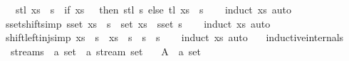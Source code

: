 \begin{isabellebody}
\ \ \ {\isachardoublequoteopen}stl\ {\isacharparenleft}xs\ {\isacharat}{\isacharminus}\ s{\isacharparenright}\ {\isacharequal}\ {\isacharparenleft}if\ xs\ {\isacharequal}\ {\isacharbrackleft}{\isacharbrackright}\ then\ stl\ s\ else\ tl\ xs\ {\isacharat}{\isacharminus}\ s{\isacharparenright}{\isachardoublequoteclose}\isanewline
%
\isadelimproof
\ \ %
\endisadelimproof
%
\isatagproof
{}\isamarkupfalse%
\ {\isacharparenleft}induct\ xs{\isacharparenright}\ auto%
\endisatagproof
{\isafoldproof}%
%
\isadelimproof
\isanewline
%
\endisadelimproof
\isanewline
{}\isamarkupfalse%
\ sset{\isacharunderscore}shift{\isacharbrackleft}simp{\isacharbrackright}{\isacharcolon}\ {\isachardoublequoteopen}sset\ {\isacharparenleft}xs\ {\isacharat}{\isacharminus}\ s{\isacharparenright}\ {\isacharequal}\ set\ xs\ {\isasymunion}\ sset\ s{\isachardoublequoteclose}\isanewline
%
\isadelimproof
\ \ %
\endisadelimproof
%
\isatagproof
{}\isamarkupfalse%
\ {\isacharparenleft}induct\ xs{\isacharparenright}\ auto%
\endisatagproof
{\isafoldproof}%
%
\isadelimproof
\isanewline
%
\endisadelimproof
\isanewline
{}\isamarkupfalse%
\ shift{\isacharunderscore}left{\isacharunderscore}inj{\isacharbrackleft}simp{\isacharbrackright}{\isacharcolon}\ {\isachardoublequoteopen}xs\ {\isacharat}{\isacharminus}\ s{}\ {\isacharequal}\ xs\ {\isacharat}{\isacharminus}\ s{}\ {\isasymlongleftrightarrow}\ s{}\ {\isacharequal}\ s{}{\isachardoublequoteclose}\isanewline
%
\isadelimproof
\ \ %
\endisadelimproof
%
\isatagproof
{}\isamarkupfalse%
\ {\isacharparenleft}induct\ xs{\isacharparenright}\ auto%
\endisatagproof
{\isafoldproof}%
%
\isadelimproof
%
\endisadelimproof
%
\isadelimdocument
%
\endisadelimdocument
%
\isatagdocument
%
\isamarkuptrue%
%
\endisatagdocument
{\isafolddocument}%
%
\isadelimdocument
%
\endisadelimdocument
{}\isamarkupfalse%
\isanewline
\ \ \ {\isacharbrackleft}{\isacharbrackleft}inductive{\isacharunderscore}internals{\isacharbrackright}{\isacharbrackright}\isanewline
{}\isanewline
\isanewline
{}\isamarkupfalse%
\isanewline
\ \ streams\ {\isacharcolon}{\isacharcolon}\ {\isachardoublequoteopen}{\isacharprime}a\ set\ {\isasymRightarrow}\ {\isacharprime}a\ stream\ set{\isachardoublequoteclose}\isanewline
\ \ \ A\ {\isacharcolon}{\isacharcolon}\ {\isachardoublequoteopen}{\isacharprime}a\ set{\isachardoublequoteclose}\isanewline

\end{isabellebody}
